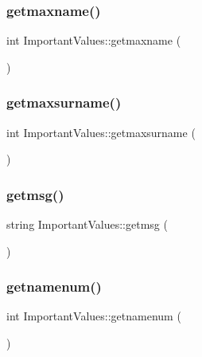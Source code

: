 \subsubsection{\texorpdfstring{getmaxname()}{getmaxname()}}
{\footnotesize\ttfamily int Important\+Values\+::getmaxname (\begin{DoxyParamCaption}{ }\end{DoxyParamCaption})\hspace{0.3cm}{\ttfamily [inline]}}

\mbox{\label{class_important_values_a86a09aed8f7ecdc5e50c130eed05ec57}} 
\subsubsection{\texorpdfstring{getmaxsurname()}{getmaxsurname()}}
{\footnotesize\ttfamily int Important\+Values\+::getmaxsurname (\begin{DoxyParamCaption}{ }\end{DoxyParamCaption})\hspace{0.3cm}{\ttfamily [inline]}}

\mbox{\label{class_important_values_a17e7030f8a42eee1075ba1bd7bef1da0}} 
\subsubsection{\texorpdfstring{getmsg()}{getmsg()}}
{\footnotesize\ttfamily string Important\+Values\+::getmsg (\begin{DoxyParamCaption}{ }\end{DoxyParamCaption})\hspace{0.3cm}{\ttfamily [inline]}}

\mbox{\label{class_important_values_af6e0630530f84a70e5894e424f16c02f}} 
\subsubsection{\texorpdfstring{getnamenum()}{getnamenum()}}
{\footnotesize\ttfamily int Important\+Values\+::getnamenum (\begin{DoxyParamCaption}{ }\end{DoxyParamCaption})\hspace{0.3cm}{\ttfamily [inline]}}

